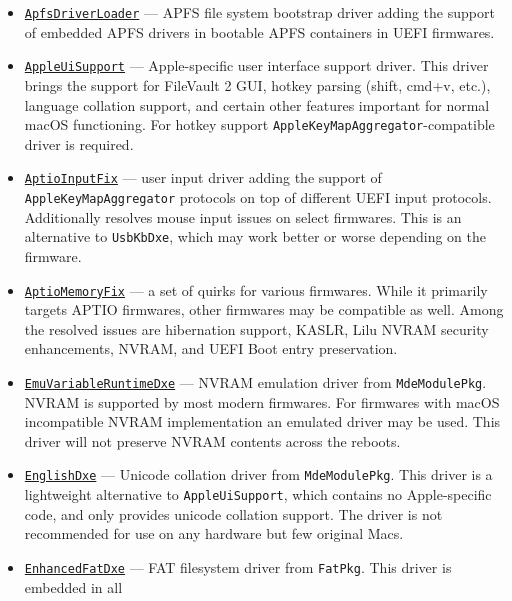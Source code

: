 \documentclass[]{article}
\providecommand{\tightlist}{%
  \setlength{\itemsep}{0pt}\setlength{\parskip}{0pt}}
\begin{document}
\begin{enumerate}
  \begin{itemize}
  \tightlist
  \item \href{https://github.com/acidanthera/AppleSupportPkg}{\texttt{ApfsDriverLoader}}
  --- APFS file system bootstrap driver adding the support of embedded APFS drivers
  in bootable APFS containers in UEFI firmwares.
  \item \href{https://github.com/acidanthera/AppleSupportPkg}{\texttt{AppleUiSupport}}
  --- Apple-specific user interface support driver. This driver brings the support
  for FileVault 2 GUI, hotkey parsing (shift, cmd+v, etc.), language collation support,
  and certain other features important for normal macOS functioning. For hotkey support
  \texttt{AppleKeyMapAggregator}-compatible driver is required.
  \item \href{https://github.com/acidanthera/AptioFixPkg}{\texttt{AptioInputFix}}
  --- user input driver adding the support of \texttt{AppleKeyMapAggregator} protocols
  on top of different UEFI input protocols. Additionally resolves mouse input issues
  on select firmwares. This is an alternative to \texttt{UsbKbDxe}, which may work
  better or worse depending on the firmware.
  \item \href{https://github.com/acidanthera/AptioFixPkg}{\texttt{AptioMemoryFix}}
  --- a set of quirks for various firmwares. While it primarily targets APTIO
  firmwares, other firmwares may be compatible as well. Among the resolved issues
  are hibernation support, KASLR, Lilu NVRAM security enhancements, NVRAM, and UEFI
  Boot entry preservation.
  \item \href{https://github.com/tianocore/edk2/tree/UDK2018}{\texttt{EmuVariableRuntimeDxe}}
  --- NVRAM emulation driver from \texttt{MdeModulePkg}. NVRAM is supported by most
  modern firmwares. For firmwares with macOS incompatible NVRAM implementation an
  emulated driver may be used. This driver will not preserve NVRAM contents across the
  reboots.
  \item \href{https://github.com/tianocore/edk2/tree/UDK2018}{\texttt{EnglishDxe}}
  --- Unicode collation driver from \texttt{MdeModulePkg}. This driver is a lightweight
  alternative to \texttt{AppleUiSupport}, which contains no Apple-specific code, and
  only provides unicode collation support. The driver is not recommended for use
  on any hardware but few original Macs.
  \item \href{https://github.com/tianocore/edk2/tree/UDK2018}{\texttt{EnhancedFatDxe}}
  --- FAT filesystem driver from \texttt{FatPkg}. This driver is embedded in all

\end{itemize}
\end{enumerate}
\end{document}
